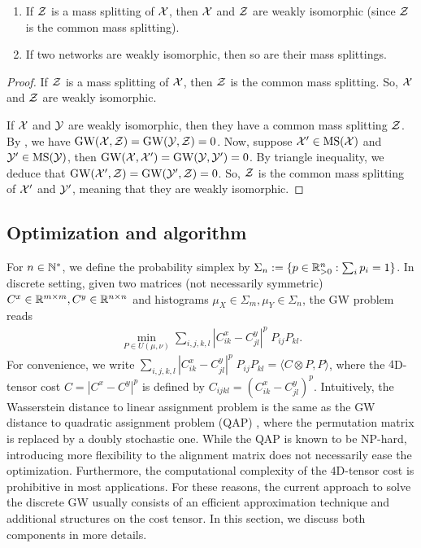 \begin{corollary}
  \text{ }
\begin{enumerate}
  \item If $\mathcal Z$ is a mass splitting of $\mathcal X$, then $\mathcal X$ and $\mathcal Z$ are weakly isomorphic
  (since $\mathcal Z$ is the common mass splitting).
  \item If two networks are weakly isomorphic, then so are their mass splittings.
\end{enumerate}
\end{corollary}
\begin{proof}
  If $\mathcal Z$ is a mass splitting of $\mathcal X$, then $\mathcal Z$ is the common mass splitting.
  So, $\mathcal X$ and $\mathcal Z$ are weakly isomorphic.

  If $\mathcal X$ and $\mathcal Y$ are weakly isomorphic, then they have a common mass splitting $\mathcal Z$.
  By , we have $\text{GW}(\mathcal X, \mathcal Z) = \text{GW}(\mathcal Y, \mathcal Z) = 0$.
  Now, suppose $\mathcal X' \in \text{MS}(\mathcal X)$ and $\mathcal Y' \in \text{MS}(\mathcal Y)$, then
  $\text{GW}(\mathcal X, \mathcal X') = \text{GW}(\mathcal Y, \mathcal Y') = 0$. By triangle inequality, we deduce that
  $\text{GW}(\mathcal X', \mathcal Z) = \text{GW}(\mathcal Y', \mathcal Z) = 0$. So, $\mathcal Z$ is the common mass splitting
  of $\mathcal X'$ and $\mathcal Y'$, meaning that they are weakly isomorphic.
\end{proof}

\subsection{Optimization and algorithm}
For $n \in \mathbb N^*$, we define the probability simplex by
$\Sigma_n := \{ p \in \mathbb R^n_{> 0}: \sum_i p_i = 1 \}$.
In discrete setting, given two matrices (not necessarily symmetric)
$C^x \in \mathbb R^{m \times m}, C^y \in \mathbb R^{n \times n}$ and histograms
$\mu_X \in \Sigma_m, \mu_Y \in \Sigma_n$, the GW problem reads
\begin{align}
  \label{eq:discrete_gw}
  \min_{P \in U(\mu, \nu)} \sum_{i,j,k,l} |C^x_{ik} - C^y_{jl}|^p \; P_{ij} P_{kl}.
\end{align}
For convenience, we write
$\sum_{i,j,k,l} |C^x_{ik} - C^y_{jl}|^p \; P_{ij} P_{kl} = \langle C \otimes P, P \rangle$,
where the $4$D-tensor cost $C = |C^x - C^y|^p$ is defined by $C_{ijkl} = (C^x_{ik} - C^y_{jl})^p$.
Intuitively, the Wasserstein distance to linear assignment problem is
the same as the GW distance to quadratic assignment problem (QAP) \citep{Koopmans57},
where the permutation matrix is replaced by a doubly stochastic one.
While the QAP is known to be NP-hard, introducing more flexibility to the alignment matrix
does not necessarily ease the optimization. Furthermore,
the computational complexity of the $4$D-tensor cost is prohibitive in most applications.
For these reasons, the current approach to solve the discrete GW usually consists of
an efficient approximation technique and additional structures on the cost tensor.
In this section, we discuss both components in more details.

